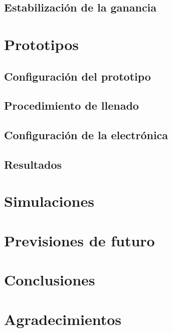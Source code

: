 \documentclass[11pt,a4paper]{article}
\begin{document}
	\subsection{Estabilización de la ganancia}\label{sec:Compensacion}
	

\newpage
\section{Prototipos} \label{sec:Prototipo}

	\subsection{Configuración del prototipo}\label{sec:Configuracion}
	
	
	\subsection{Procedimiento de llenado}\label{sec:Llenado}
	
	
	\subsection{Configuración de la electrónica}\label{sec:Electronica}
	
	
	\subsection{Resultados}\label{sec:Resultados}
	

\newpage
\section{Simulaciones} \label{sec:Simulaciones}


\newpage
\section{Previsiones de futuro} \label{sec:Futuro}


\newpage
\section{Conclusiones} \label{sec:Conclusiones}


\section*{Agradecimientos} \label{sec:Agradecimientos}



\end{document}
